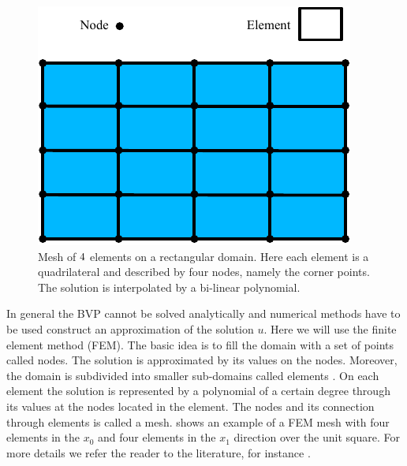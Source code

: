 \begin{figure}[ht]
\centerline{\includegraphics[width=\figwidth]{figures/FirstStepMesh}}
\caption{Mesh of $4 \time 4$ elements on a rectangular domain.  Here
each element is a quadrilateral and described by four nodes, namely
the corner points. The solution is interpolated by a bi-linear
polynomial.}
\label{fig:FirstSteps.2}
\end{figure}

In general the BVP cannot be solved analytically and numerical
methods have to be used construct an approximation of the solution
$u$. Here we will use the finite element method (FEM). The basic idea is to fill the domain with a
set of points called nodes. The solution is approximated by its
values on the nodes. Moreover, the domain is subdivided into smaller
sub-domains called elements . On each element the solution is
represented by a polynomial of a certain degree through its values at
the nodes located in the element. The nodes and its connection through
elements is called a mesh.  shows an
example of a FEM mesh with four elements in the $x_0$ and four elements
in the $x_1$ direction over the unit square.  
For more details we refer the reader to the literature, for instance .

